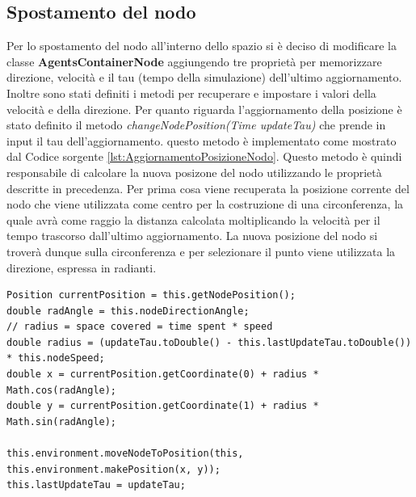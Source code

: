 \documentclass[12pt,a4paper,openright,twoside]{report}
\begin{document}
\subsection{Spostamento del nodo}
Per lo spostamento del nodo all'interno dello spazio si \`e deciso di modificare la classe \textbf{AgentsContainerNode} aggiungendo tre propriet\`a per memorizzare direzione, velocit\`a e il tau (tempo della simulazione) dell'ultimo aggiornamento. Inoltre sono stati definiti i metodi per recuperare e impostare i valori della velocit\`a e della direzione.
Per quanto riguarda l'aggiornamento della posizione \`e stato definito il metodo \textit{changeNodePosition(Time updateTau)} che prende in input il tau dell'aggiornamento.
questo metodo \`e implementato come mostrato dal Codice sorgente \ref{lst:AggiornamentoPosizioneNodo}.
Questo metodo \`e quindi responsabile di calcolare la nuova posizone del nodo utilizzando le propriet\`a descritte in precedenza. Per prima cosa viene recuperata la posizione corrente del nodo che viene utilizzata come centro per la costruzione di una circonferenza, la quale avr\`a come raggio la distanza calcolata moltiplicando la velocit\`a per il tempo trascorso dall'ultimo aggiornamento. La nuova posizione del nodo si trover\`a dunque sulla circonferenza e per selezionare il punto viene utilizzata la direzione, espressa in radianti.
\medskip
\begin{lstlisting}[label={lst:AggiornamentoPosizioneNodo},caption={Metodo per l'aggiornamento della posizione del nodo}]
Position currentPosition = this.getNodePosition();
double radAngle = this.nodeDirectionAngle;
// radius = space covered = time spent * speed
double radius = (updateTau.toDouble() - this.lastUpdateTau.toDouble()) * this.nodeSpeed;
double x = currentPosition.getCoordinate(0) + radius * Math.cos(radAngle);
double y = currentPosition.getCoordinate(1) + radius * Math.sin(radAngle);

this.environment.moveNodeToPosition(this, this.environment.makePosition(x, y));
this.lastUpdateTau = updateTau;
\end{lstlisting}
\end{document}
